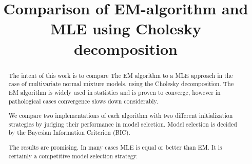 \documentclass[11pt,a4paper,twoside,openright]{report}
\theoremstyle{definition}
\numberwithin{equation}{subsection}
\begin{document}


 \alternatereaderprefix{}
 \alternatereader{}
 \title{Comparison of EM-algorithm and MLE using Cholesky decomposition} %

 \maketitle%

 \newpage
\begin{abstract}
	The intent of this work is to compare The EM algorithm to a MLE approach in the
	case of multivariate normal mixture models. 
    using the Cholesky decomposition.
	The EM algorithm is widely used in statistics and is proven to converge, 
	however in pathological cases convergence slows down considerably. 

    We compare two implementations of each algorithm with two different 
    initialization strategies by judging their performance in model selection.
    Model selection is decided by the Bayesian Information Criterion (BIC).

    The results are promising. In many cases MLE is equal or better than EM.
    It is certainly a competitive model selection strategy.
\end{abstract}

\newpage
\tableofcontents
\newpage
\listoffigures
\newpage
\listoftables
\cleardoublepage
\end{document}

